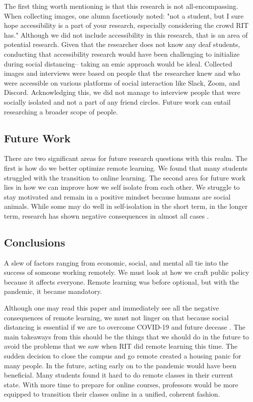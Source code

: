 \documentclass[12pt,
 reprint,
nofootinbib,
 amsmath,amssymb,
 aps,
floatfix,
]{revtex4-2}
\begin{document}
The first thing worth mentioning is that this research is not all-encompassing. When collecting images, one alumn facetiously noted: "not a student, but I sure hope accessibility is a part of your research, especially considering the crowd RIT has." Although we did not include accessibility in this research, that is an area of potential research. Given that the researcher does not know any deaf students, conducting that accessibility research would have been challenging to initialize during social distancing-- taking an emic approach would be ideal.
Collected images and interviews were based on people that the researcher knew and who were accessible on various platforms of social interaction like Slack, Zoom, and Discord. Acknowledging this, we did not manage to interview people that were socially isolated and not a part of any friend circles. Future work can entail researching a broader scope of people. 



\subsection{Future Work}


There are two significant areas for future research questions with this realm. The first is how do we better optimize remote learning. We found that many students struggled with the transition to online learning. The second area for future work lies in how we can improve how we self isolate from each other. We struggle to stay motivated and remain in a positive mindset because humans are social animals. While some may do well in self-isolation in the short term, in the longer term, research has shown negative consequences in almost all cases \cite{alone}.  

\subsection{Conclusions}

A slew of factors ranging from economic, social, and mental all tie into the success of someone working remotely. We must look at how we craft public policy because it affects everyone. Remote learning was before optional, but with the pandemic, it became mandatory.

Although one may read this paper and immediately see all the negative consequences of remote learning, we must not linger on that because social distancing is essential if we are to overcome COVID-19 and future decease \cite{covidItaly}. The main takeaways from this should be the things that we should do in the future to avoid the problems that we saw when RIT did remote learning this time. The sudden decision to close the campus and go remote created a housing panic for many people. In the future, acting early on to the pandemic would have been beneficial. Many students found it hard to do remote classes in their current state. With more time to prepare for online courses, professors would be more equipped to transition their classes online in a unified, coherent fashion.
\end{document}
